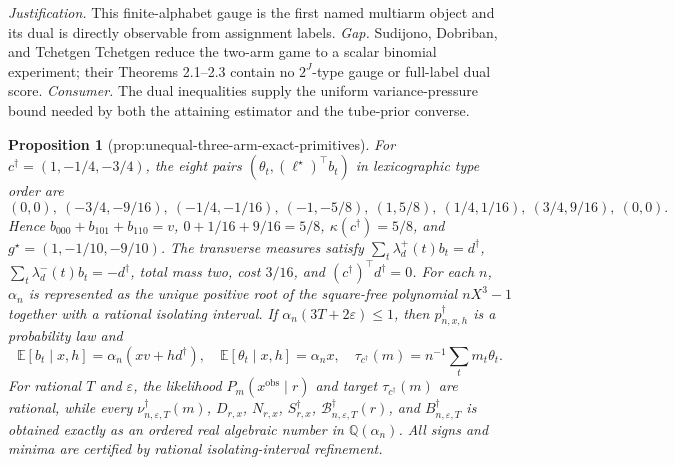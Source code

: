 \documentclass{article}
\newtheorem{proposition}{Proposition}
\begin{document}
\par\smallskip\noindent \textit{Justification.} This finite-alphabet gauge is the first named multiarm object and its dual is directly observable from assignment labels. \textit{Gap.} Sudijono, Dobriban, and Tchetgen Tchetgen reduce the two-arm game to a scalar binomial experiment; their Theorems 2.1--2.3 contain no \(2^J\)-type gauge or full-label dual score. \textit{Consumer.} The dual inequalities supply the uniform variance-pressure bound needed by both the attaining estimator and the tube-prior converse.

\begin{proposition}[prop:unequal-three-arm-exact-primitives]\label{prop:unequal-three-arm-exact-primitives}
For \(c^\dagger=(1,-1/4,-3/4)\), the eight pairs \((\theta_t,(\ell^\star)^\top b_t)\) in lexicographic type order are \[(0,0),\ (-3/4,-9/16),\ (-1/4,-1/16),\ (-1,-5/8),\ (1,5/8),\ (1/4,1/16),\ (3/4,9/16),\ (0,0).\] Hence \(b_{000}+b_{101}+b_{110}=v\), \(0+1/16+9/16=5/8\), \(\kappa(c^\dagger)=5/8\), and \(g^\star=(1,-1/10,-9/10)\). The transverse measures satisfy \(\sum_t\lambda_d^+(t)b_t=d^\dagger\), \(\sum_t\lambda_d^-(t)b_t=-d^\dagger\), total mass two, cost \(3/16\), and \((c^\dagger)^\top d^\dagger=0\). For each \(n\), \(\alpha_n\) is represented as the unique positive root of the square-free polynomial \(nX^3-1\) together with a rational isolating interval. If \(\alpha_n(3T+2\varepsilon)\le1\), then \(p_{n,x,h}^\dagger\) is a probability law and \[\mathbb E[b_t\mid x,h]=\alpha_n(xv+hd^\dagger),\quad \mathbb E[\theta_t\mid x,h]=\alpha_n x,\quad \tau_{c^\dagger}(m)=n^{-1}\sum_tm_t\theta_t.\] For rational \(T\) and \(\varepsilon\), the likelihood \(P_m(x^{\mathrm{obs}}\mid r)\) and target \(\tau_{c^\dagger}(m)\) are rational, while every \(\nu_{n,\varepsilon,T}^\dagger(m)\), \(D_{r,x}\), \(N_{r,x}\), \(S_{r,x}^\dagger\), \(\mathcal B_{n,\varepsilon,T}^\dagger(r)\), and \(B_{n,\varepsilon,T}^\dagger\) is obtained exactly as an ordered real algebraic number in \(\mathbb Q(\alpha_n)\). All signs and minima are certified by rational isolating-interval refinement.
\end{proposition}
\end{document}
